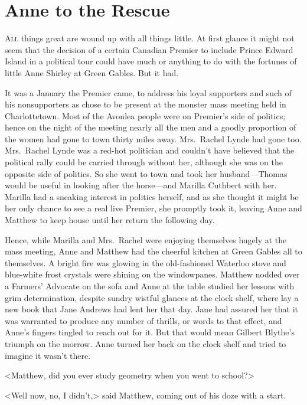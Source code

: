 \chapter{Anne to the Rescue}
	
\lettrine[]{A}{ll} things great are wound up with all things little. At first glance it might not seem that the decision of a certain Canadian Premier to include Prince Edward Island in a political tour could have much or anything to do with the fortunes of little Anne Shirley at Green Gables. But it had.

It was a January the Premier came, to address his loyal supporters and such of his nonsupporters as chose to be present at the monster mass meeting held in Charlottetown. Most of the Avonlea people were on Premier's side of politics; hence on the night of the meeting nearly all the men and a goodly proportion of the women had gone to town thirty miles away. Mrs.~Rachel Lynde had gone too. Mrs.~Rachel Lynde was a red-hot politician and couldn't have believed that the political rally could be carried through without her, although she was on the opposite side of politics. So she went to town and took her husband—Thomas would be useful in looking after the horse—and Marilla Cuthbert with her. Marilla had a sneaking interest in politics herself, and as she thought it might be her only chance to see a real live Premier, she promptly took it, leaving Anne and Matthew to keep house until her return the following day.

Hence, while Marilla and Mrs.~Rachel were enjoying themselves hugely at the mass meeting, Anne and Matthew had the cheerful kitchen at Green Gables all to themselves. A bright fire was glowing in the old-fashioned Waterloo stove and blue-white frost crystals were shining on the windowpanes. Matthew nodded over a Farmers' Advocate on the sofa and Anne at the table studied her lessons with grim determination, despite sundry wistful glances at the clock shelf, where lay a new book that Jane Andrews had lent her that day. Jane had assured her that it was warranted to produce any number of thrills, or words to that effect, and Anne's fingers tingled to reach out for it. But that would mean Gilbert Blythe's triumph on the morrow. Anne turned her back on the clock shelf and tried to imagine it wasn't there.

<Matthew, did you ever study geometry when you went to school?>

<Well now, no, I didn't,> said Matthew, coming out of his doze with a start.

